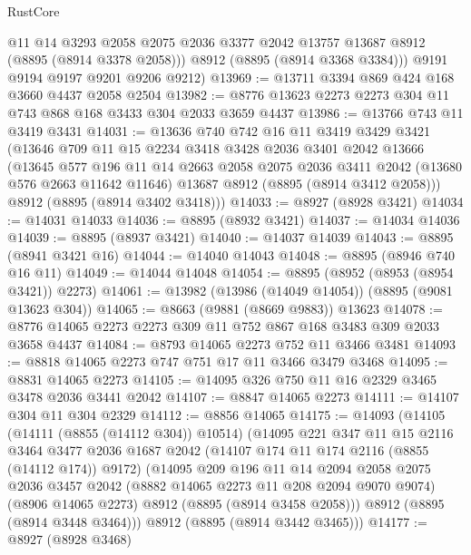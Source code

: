 \begin{lexlean}{RustCore}
\begin{coremodule}
          @11
          @14
          @3293
          @2058
          @2075
          @2036
          @3377
          @2042
          @13757
          @13687
          @8912
          (@8895 (@8914 @3378 @2058)))
        @8912
        (@8895 (@8914 @3368 @3384)))
      @9191
      @9194
      @9197
      @9201
      @9206
      @9212)
@13969 := @13711 @3394 @869 @424 @168 @3660 @4437 @2058 @2504
@13982 := @8776 @13623 @2273 @2273 @304 @11 @743 @868 @168 @3433 @304 @2033 @3659 @4437
@13986 := @13766 @743 @11 @3419 @3431
@14031 := @13636
    @740
    @742
    @16
    @11
    @3419
    @3429
    @3421
    (@13646
      @709
      @11
      @15
      @2234
      @3418
      @3428
      @2036
      @3401
      @2042
      @13666
      (@13645
        @577
        @196
        @11
        @14
        @2663
        @2058
        @2075
        @2036
        @3411
        @2042
        (@13680 @576 @2663 @11642 @11646)
        @13687
        @8912
        (@8895 (@8914 @3412 @2058)))
      @8912
      (@8895 (@8914 @3402 @3418)))
@14033 := @8927 (@8928 @3421)
@14034 := @14031 @14033
@14036 := @8895 (@8932 @3421)
@14037 := @14034 @14036
@14039 := @8895 (@8937 @3421)
@14040 := @14037 @14039
@14043 := @8895 (@8941 @3421 @16)
@14044 := @14040 @14043
@14048 := @8895 (@8946 @740 @16 @11)
@14049 := @14044 @14048
@14054 := @8895 (@8952 (@8953 (@8954 @3421)) @2273)
@14061 := @13982 (@13986 (@14049 @14054)) (@8895 (@9081 @13623 @304))
@14065 := @8663 (@9881 (@8669 @9883)) @13623
@14078 := @8776 @14065 @2273 @2273 @309 @11 @752 @867 @168 @3483 @309 @2033 @3658 @4437
@14084 := @8793 @14065 @2273 @752 @11 @3466 @3481
@14093 := @8818 @14065 @2273 @747 @751 @17 @11 @3466 @3479 @3468
@14095 := @8831 @14065 @2273
@14105 := @14095 @326 @750 @11 @16 @2329 @3465 @3478 @2036 @3441 @2042
@14107 := @8847 @14065 @2273
@14111 := @14107 @304 @11 @304 @2329
@14112 := @8856 @14065
@14175 := @14093
    (@14105
      (@14111 (@8855 (@14112 @304)) @10514)
      (@14095
        @221
        @347
        @11
        @15
        @2116
        @3464
        @3477
        @2036
        @1687
        @2042
        (@14107 @174 @11 @174 @2116 (@8855 (@14112 @174)) @9172)
        (@14095
          @209
          @196
          @11
          @14
          @2094
          @2058
          @2075
          @2036
          @3457
          @2042
          (@8882 @14065 @2273 @11 @208 @2094 @9070 @9074)
          (@8906 @14065 @2273)
          @8912
          (@8895 (@8914 @3458 @2058)))
        @8912
        (@8895 (@8914 @3448 @3464)))
      @8912
      (@8895 (@8914 @3442 @3465)))
@14177 := @8927 (@8928 @3468)

\end{coremodule}
\end{lexlean}
